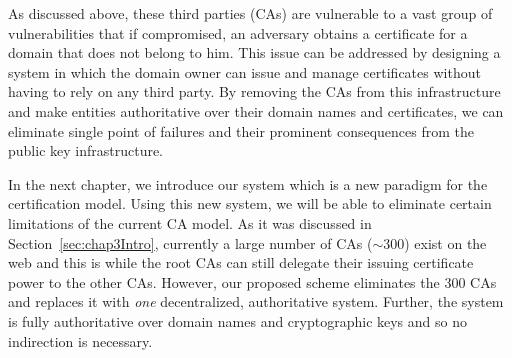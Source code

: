 As discussed above, these third parties (CAs) are vulnerable to a vast group of vulnerabilities that if compromised, an adversary obtains a certificate for a domain that does not belong to him. This issue can be addressed by designing a system in which the domain owner can issue and manage certificates without having to rely on any third party. By removing the CAs from this infrastructure and make entities authoritative over their domain names and certificates, we can eliminate single point of failures and their prominent consequences from the public key infrastructure. 

In the next chapter, we introduce our system which is a new paradigm for the certification model. Using this new system, we will be able to eliminate certain limitations of the current CA model. As it was discussed in Section~\ref{sec:chap3Intro}, currently a large number of CAs (${\sim}$300) exist on the web and this is while the root CAs can still delegate their issuing certificate power to the other CAs. However, our proposed scheme eliminates the 300 CAs and replaces it with \emph{one} decentralized, authoritative system. Further, the system is fully authoritative over domain names and cryptographic keys and so no indirection is necessary. 


